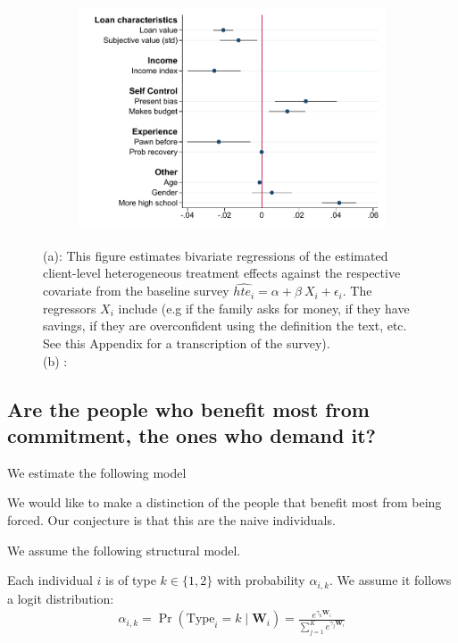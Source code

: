 \documentclass[oneside,11pt]{article}
\begin{document}
\begin{figure}[H]
\begin{center}
\begin{subfigure}{0.475\textwidth}
        \includegraphics[width=\textwidth]{Figuras/HE/ps_int_vertical_pr_gbc_1.pdf}
    \end{subfigure}
  
    \end{center}
     \scriptsize  (a): This figure estimates bivariate regressions of the estimated client-level heterogeneous treatment effects against the respective covariate from the baseline survey  $\widehat{hte_i} = \alpha + \beta \: X_i + \epsilon_i$. The regressors $X_i$ include (e.g if the family asks for money, if they have savings, if they are overconfident using the definition the text, etc. See this Appendix for a transcription of the survey). \\
     (b) :  
\end{figure}


\subsection{Are the people who benefit most from commitment, the ones who demand it?}

We estimate the following model

We would like to make a distinction of the people that benefit most from being forced. Our conjecture is that this are the naive individuals. 

We assume the following structural model. 


Each individual $i$ is of type  $k\in\{1, 2\}$ with probability $\alpha_{i,k}$. We assume it follows a logit distribution:
\begin{align*}
\label{dist_alpha}
    \alpha_{i,k} = \Pr(\text{Type}_i = k \;|\; \mathbf{W}_{i}) = \frac{e^{\gamma_{k}\mathbf{W}_i}}{\sum_{j=1}^{K} e^{\gamma_{j}\mathbf{W}_i}}
\end{align*}
\end{document}
